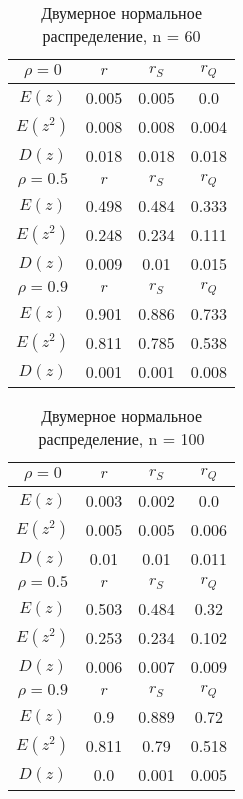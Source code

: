 \documentclass{article}
\begin{document}
	
	\begin{table}[H]
		\centering
		\begin{tabular}{| c | c | c | c |}
			
			\hline
			$\rho = 0$ & $r$      & $r_S$  & $r_Q$ \\
			\hline
			$E(z)$    & 0.005 & 0.005 & 0.0   \\
            $E(z^{2})$  & 0.008 & 0.008 & 0.004 \\
            $D(z)$    & 0.018 & 0.018 & 0.018 \\
			\hline
			$\rho = 0.5$ & $r$      & $r_S$  & $r_Q$ \\
			\hline
			$E(z)$      & 0.498 & 0.484 & 0.333 \\
            $E(z^{2})$    & 0.248 & 0.234 & 0.111 \\
            $D(z)$      & 0.009 & 0.01  & 0.015 \\
			\hline
			$\rho = 0.9$ & $r$      & $r_S$  & $r_Q$ \\
			\hline
			$E(z)$      & 0.901 & 0.886 & 0.733 \\
            $E(z^{2})$    & 0.811 & 0.785 & 0.538 \\
            $D(z)$      & 0.001 & 0.001 & 0.008 \\
			\hline
			
		\end{tabular}{}
		\caption{Двумерное нормальное распределение, n = 60}
		\label{tab:n60}
	\end{table}
	
	
	
	\begin{table}[H]
		\centering
		\begin{tabular}{| c | c | c | c |}
			
			\hline
			$\rho = 0$ & $r$      & $r_S$  & $r_Q$ \\
			\hline
			$E(z)$    & 0.003 & 0.002 & 0.0   \\
            $E(z^{2})$  & 0.005 & 0.005 & 0.006 \\
            $D(z)$    & 0.01  & 0.01  & 0.011 \\
			\hline
			$\rho = 0.5$ & $r$      & $r_S$  & $r_Q$ \\
			\hline
			$E(z)$      & 0.503 & 0.484 & 0.32  \\
            $E(z^{2})$    & 0.253 & 0.234 & 0.102 \\
            $D(z)$      & 0.006 & 0.007 & 0.009 \\
			\hline
			$\rho = 0.9$ & $r$      & $r_S$  & $r_Q$ \\
			\hline
			$E(z)$      & 0.9   & 0.889 & 0.72  \\
            $E(z^{2})$    & 0.811 & 0.79  & 0.518 \\
            $D(z)$      & 0.0   & 0.001 & 0.005 \\
			\hline
			
		\end{tabular}{}
		\caption{Двумерное нормальное распределение, n = 100}
		\label{tab:n100}
	\end{table}
	
\end{document}
